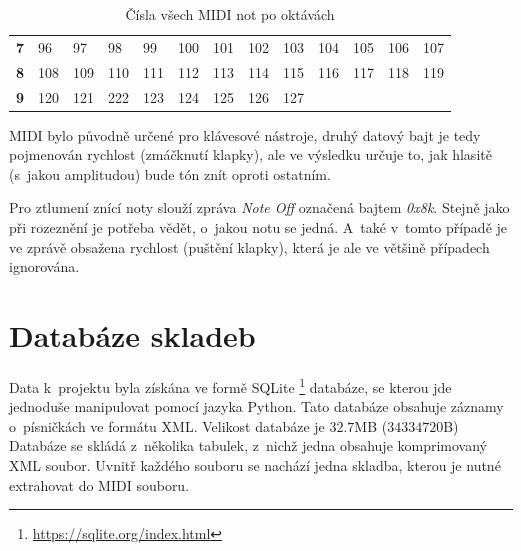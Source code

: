\begin{table}[]
\begin{tabular}{l|llllllllllll}
        \textbf{7}                       & 96         & 97           & 98         & 99           & 100        & 101        & 102          & 103        & 104          & 105        & 106          & 107        \\
        \textbf{8}                       & 108        & 109          & 110        & 111          & 112        & 113        & 114          & 115        & 116          & 117        & 118          & 119        \\
        \textbf{9}                       & 120        & 121          & 222        & 123          & 124        & 125        & 126          & 127        & \multicolumn{4}{l}{}                                 
    \end{tabular}
    \caption{Čísla všech MIDI not po oktávách \cite{Back_SMF_Specif}}
    \label{tableMIDINotes}
\end{table}

MIDI bylo původně určené pro klávesové nástroje, 
druhý datový bajt je tedy pojmenován rychlost (zmáčknutí klapky),
ale ve výsledku určuje to, jak hlasitě (s~jakou amplitudou) bude tón znít oproti ostatním.

Pro ztlumení znící noty slouží zpráva \emph{Note Off} označená bajtem \emph{0x8k}.
Stejně jako při rozeznění je potřeba vědět, o~jakou notu se jedná.
A~také v~tomto případě je ve zprávě obsažena rychlost (puštění klapky), 
která je ale ve většině případech ignorována.
\cite{MIDI_tutorials}

\section{Databáze skladeb}
\label{hooktheoryDB}
Data k~projektu byla získána ve formě SQLite
\footnote{\url{https://sqlite.org/index.html}} databáze,
se kterou jde jednoduše manipulovat pomocí jazyka Python.
Tato databáze obsahuje záznamy o~písničkách ve formátu XML.
Velikost databáze je $32.7$MB ($34 334 720$B)
Databáze se skládá z~několika tabulek,
z~nichž jedna obsahuje komprimovaný XML soubor.
Uvnitř každého souboru se nachází jedna skladba,
kterou je nutné extrahovat do MIDI souboru.
\par

